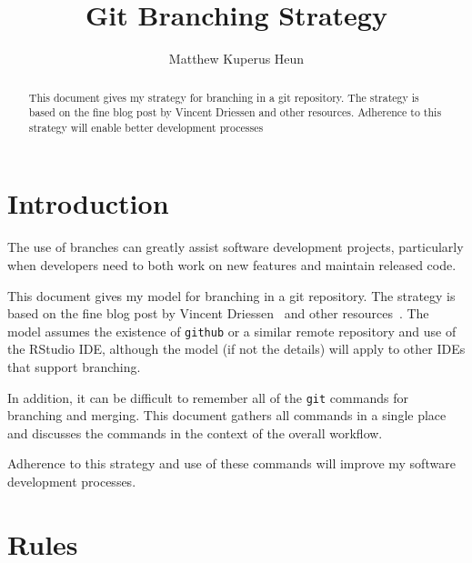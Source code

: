 \documentclass{article}
\begin{document}
\title{Git Branching Strategy}
\author{Matthew Kuperus Heun}

\maketitle


\begin{abstract}

This document gives my strategy for branching in a git repository. 
The strategy is based on the fine blog post by Vincent Driessen
and other resources.
Adherence to this strategy will enable better development processes
\end{abstract}


\section{Introduction} 
\label{sec:introduction}

The use of branches can greatly assist software development projects, 
particularly when developers need to both 
work on new features and maintain released code.

This document gives my model for branching in a git repository. 
The strategy is based on the fine blog post by Vincent Driessen~\cite{Driessen:2010}
and other resources~\cite{Onkelinx:2017, Rankin:2010}.
The model assumes the existence of \texttt{github} or a similar remote repository
and use of the RStudio IDE, 
although the model (if not the details) 
will apply to other IDEs that support branching. 

In addition, it can be difficult to remember 
all of the \texttt{git} commands for branching and merging.
This document gathers all commands in a single place
and discusses the commands in the context of the overall workflow.
 
Adherence to this strategy and use of these commands 
will improve my software development processes.


\section{Rules} 
\label{sec:rules}
\end{document}
